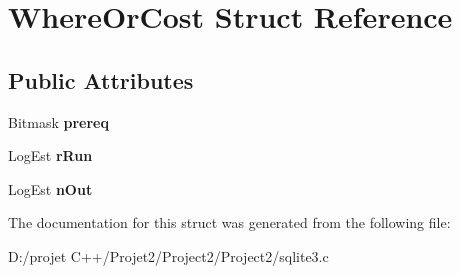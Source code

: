 \hypertarget{struct_where_or_cost}{}\section{Where\+Or\+Cost Struct Reference}
\label{struct_where_or_cost}
\subsection*{Public Attributes}
\begin{DoxyCompactItemize}
\item 
\mbox{\label{struct_where_or_cost_a42609e928af86f1783c1e579873b2b4d}} 
Bitmask {\bfseries prereq}
\item 
\mbox{\label{struct_where_or_cost_ac79c4a236da795623ec2a40592fe2617}} 
Log\+Est {\bfseries r\+Run}
\item 
\mbox{\label{struct_where_or_cost_af2305e66af19f5cc067178bcc4fb34a8}} 
Log\+Est {\bfseries n\+Out}
\end{DoxyCompactItemize}


The documentation for this struct was generated from the following file\+:\begin{DoxyCompactItemize}
\item 
D\+:/projet C++/\+Projet2/\+Project2/\+Project2/sqlite3.\+c\end{DoxyCompactItemize}
